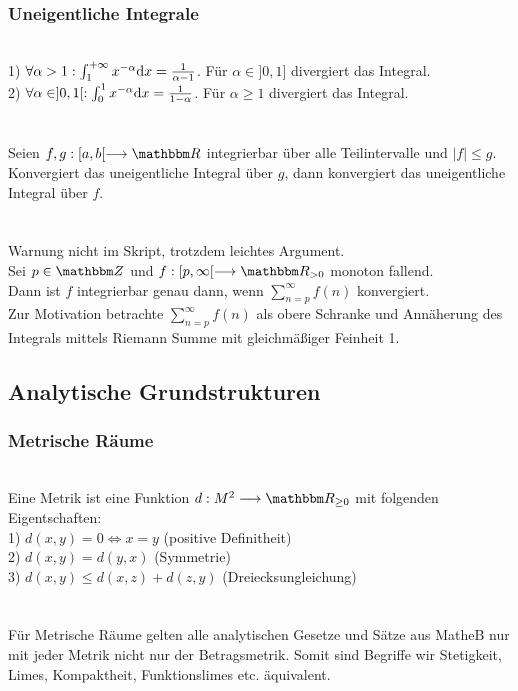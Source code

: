 \subsubsection*{Uneigentliche Integrale}
 \\
1) \(\forall \alpha > 1: \int_{1}^{+\infty} x^{-\alpha} \text d x = \frac{1}{\alpha - 1}\). \puffer Für \(\alpha \in {]0{,}1]}\) divergiert das Integral. \\
2) \(\forall \alpha \in ]0,1[: \int_{0}^{1}x^{-\alpha} \text d x = \frac{1}{1 - \alpha}\). \puffer Für \(\alpha \ge 1\) divergiert das Integral. \\ \\
 \\
Seien \(f,g: [a,b[ \longrightarrow \R\) integrierbar über alle Teilintervalle und \(|f| \le g\). \\
Konvergiert das uneigentliche Integral über \(g\), dann konvergiert das uneigentliche Integral über \(f\). \\ \\
 \\
Warnung nicht im Skript, trotzdem leichtes Argument. \\
Sei \(p \in \Z\) und \(f : [p, \infty[ \longrightarrow \R_{> 0}\) monoton fallend. \\
Dann ist \(f\) integrierbar genau dann, wenn \(\sum_{n = p}^{\infty} f(n)\) konvergiert. \\
Zur Motivation betrachte \(\sum_{n = p}^{\infty} f(n)\) als obere Schranke und Annäherung des Integrals mittels Riemann Summe mit gleichmäßiger Feinheit 1.
\subsection*{Analytische Grundstrukturen}
\subsubsection*{Metrische Räume}
 \\
Eine Metrik ist eine Funktion \(d : M^2 \longrightarrow \R_{\ge 0}\) mit folgenden Eigentschaften:\\
1) \(d(x,y) = 0 \Longleftrightarrow x = y\) \puffer \puffer \gap \gap (positive Definitheit) \\
2) \(d(x,y) = d(y,x)\) \puffer \puffer \puffer \puffer \gap \gap \gap (Symmetrie) \\
3) \(d(x,y) \le d(x,z) + d(z,y)\) \puffer (Dreiecksungleichung) \\ \\
 \\
Für Metrische Räume gelten alle analytischen Gesetze und Sätze aus MatheB nur mit jeder Metrik nicht nur der Betragsmetrik.
Somit sind Begriffe wir Stetigkeit, Limes, Kompaktheit, Funktionslimes etc. äquivalent.
